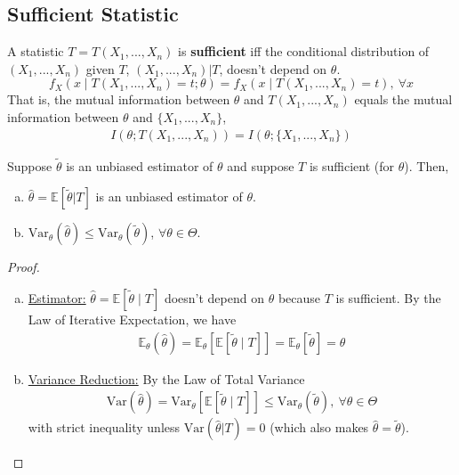 \documentclass[11pt]{elegantbook}
\begin{document}
\subsection{Sufficient Statistic}
\begin{definition}
    \normalfont
    A statistic $T=T(X_1,...,X_n)$ is \textbf{sufficient} iff the conditional distribution of $(X_1,...,X_n)$ given $T$, $(X_1,...,X_n)|T$, doesn't depend on $\theta$.
    $$f_X(x\mid T(X_1,...,X_n)=t;\theta)=f_X(x\mid T(X_1,...,X_n)=t),\ \forall x$$
    That is, the mutual information between $\theta$ and $T(X_1,...,X_n)$ equals the mutual information between $\theta$ and $\{X_1,...,X_n\}$,
    \begin{equation}
        \begin{aligned}
            I(\theta;T(X_1,...,X_n))=I(\theta;\{X_1,...,X_n\})
        \end{aligned}
        \nonumber
    \end{equation}
\end{definition}

\begin{theorem}
    \normalfont
    Suppose $\tilde{\theta}$ is an unbiased estimator of $\theta$ and suppose $T$ is sufficient (for $\theta$). Then,
    \begin{enumerate}[(a).]
        \item $\hat{\theta}=\mathbb{E}[\tilde{\theta}|T]$ is an unbiased estimator of $\theta$.
        \item $\text{Var}_\theta(\hat{\theta})\leq \text{Var}_\theta(\tilde{\theta})$, $\forall \theta\in\Theta$.
    \end{enumerate}
\end{theorem}
\begin{proof}
    \begin{enumerate}[(a).]
        \item \underline{Estimator:} $\hat{\theta}=\mathbb{E}[\tilde{\theta}\mid T]$ doesn't depend on $\theta$ because $T$ is sufficient. By the Law of Iterative Expectation, we have
        \begin{equation}
            \begin{aligned}
                \mathbb{E}_\theta(\hat{\theta})=\mathbb{E}_\theta[\mathbb{E}[\tilde{\theta}\mid T]]=\mathbb{E}_\theta[\tilde{\theta}]=\theta
            \end{aligned}
            \nonumber
        \end{equation}
        \item \underline{Variance Reduction:} By the Law of Total Variance
        \begin{equation}
            \begin{aligned}
                \text{Var}(\hat{\theta})=\text{Var}_\theta[\mathbb{E}[\tilde{\theta}\mid T]]\leq \text{Var}_\theta(\tilde{\theta}),\ \forall \theta\in \Theta
            \end{aligned}
            \nonumber
        \end{equation}
        with strict inequality unless $\text{Var}(\hat{\theta}|T)=0$ (which also makes $\hat{\theta}=\tilde{\theta}$).
    \end{enumerate}
\end{proof}
\end{document}
